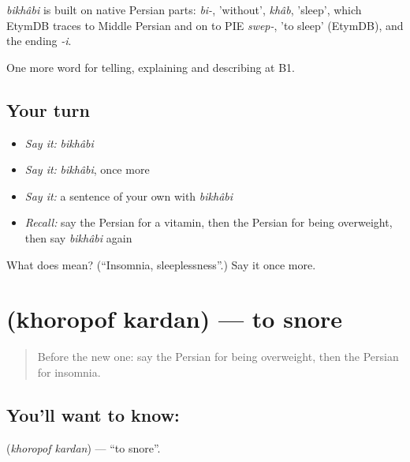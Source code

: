 \begin{cousinweb}
\emph{bikhâbi} is built on native Persian parts: \emph{bi-}, 'without', \emph{khâb}, 'sleep', which EtymDB traces to Middle Persian and on to PIE \emph{swep-}, 'to sleep' (EtymDB), and the ending \emph{-i}.
\end{cousinweb}

\begin{grammarlens}[title={What you've built}]
One more word for telling, explaining and describing at B1.
\end{grammarlens}

\subsection*{Your turn}
\begin{itemize}
\raggedright
  \item \emph{Say it:} \emph{bikhâbi}
  \item \emph{Say it:} \emph{bikhâbi}, once more
  \item \emph{Say it:} a sentence of your own with \emph{bikhâbi}
  \item \emph{Recall:} say the Persian for a vitamin, then the Persian for being overweight, then say \emph{bikhâbi} again
\end{itemize}

\begin{tcolorbox}[breakable,colback=teal!4,colframe=teal!35!black,title={Before you move on}]
What does  mean? (\textquotedblleft{}Insomnia, sleeplessness\textquotedblright{}.) Say it once more.
\end{tcolorbox}
\section[\texorpdfstring{\fa{خروپف} \fa{کردن} (khoropof kardan)}{خروپف کردن (khoropof kardan)}]{  (khoropof kardan) — to snore}

\label{lesson:FA-C499-khoropof-kardan}



\begin{quote}
Before the new one: say the Persian for being overweight, then the Persian for insomnia.
\end{quote}

\subsection*{You'll want to know:  }
\textbf{ } (\emph{khoropof kardan}) — \textquotedblleft{}to snore\textquotedblright{}.

